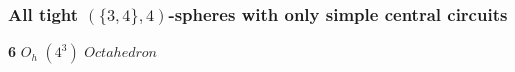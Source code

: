 \documentclass{beamer}
\begin{document}
\begin{frame}\frametitle{All tight $(\{3,4\},4)$-spheres with only simple
central circuits}
\vspace{-2mm}
\begin{center}
\begin{minipage}{2.2cm}
\centering
{}\par
{\bf 6}  $O_h$
$(4^3)$ {\bf $Octahedron$}
\end{minipage}
\begin{minipage}{2.2cm}
\centering

\end{minipage}
\end{center}
\end{frame}
\end{document}
